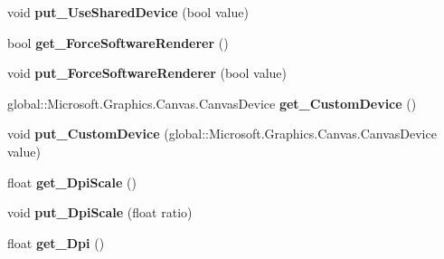 \begin{DoxyCompactItemize}
void {\bfseries put\+\_\+\+Use\+Shared\+Device} (bool value)
\item 
\mbox{\label{class_microsoft_1_1_graphics_1_1_canvas_1_1_u_i_1_1_xaml_1_1_canvas_control_a51aee0f1702e89a1b82f375115a547d2}} 
bool {\bfseries get\+\_\+\+Force\+Software\+Renderer} ()
\item 
\mbox{\label{class_microsoft_1_1_graphics_1_1_canvas_1_1_u_i_1_1_xaml_1_1_canvas_control_aca2f5a0d6e74e822c5b8eb8fdc11fdb7}} 
void {\bfseries put\+\_\+\+Force\+Software\+Renderer} (bool value)
\item 
\mbox{\label{class_microsoft_1_1_graphics_1_1_canvas_1_1_u_i_1_1_xaml_1_1_canvas_control_af204874c5165fa9f4ae14854c00c88eb}} 
global\+::\+Microsoft.\+Graphics.\+Canvas.\+Canvas\+Device {\bfseries get\+\_\+\+Custom\+Device} ()
\item 
\mbox{\label{class_microsoft_1_1_graphics_1_1_canvas_1_1_u_i_1_1_xaml_1_1_canvas_control_ac2d0adb9485907acaacb48b62a8b4f36}} 
void {\bfseries put\+\_\+\+Custom\+Device} (global\+::\+Microsoft.\+Graphics.\+Canvas.\+Canvas\+Device value)
\item 
\mbox{\label{class_microsoft_1_1_graphics_1_1_canvas_1_1_u_i_1_1_xaml_1_1_canvas_control_a56d9356dc66e6dcf13a6fe9f68148a9f}} 
float {\bfseries get\+\_\+\+Dpi\+Scale} ()
\item 
\mbox{\label{class_microsoft_1_1_graphics_1_1_canvas_1_1_u_i_1_1_xaml_1_1_canvas_control_ac93ee9daef7c500b489c7d75ea50a9c1}} 
void {\bfseries put\+\_\+\+Dpi\+Scale} (float ratio)
\item 
\mbox{\label{class_microsoft_1_1_graphics_1_1_canvas_1_1_u_i_1_1_xaml_1_1_canvas_control_a153a81ae73a3695b423fcc92a0f866f5}} 
float {\bfseries get\+\_\+\+Dpi} ()
\item 

\end{DoxyCompactItemize}

